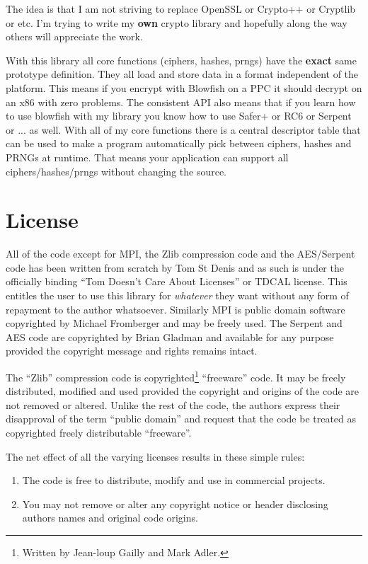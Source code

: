 \documentclass{book}
\begin{document}
The idea is that I am not striving to replace OpenSSL or Crypto++ or Cryptlib or etc.  I'm trying to write my 
{\bf own} crypto library and hopefully along the way others will appreciate the work.

With this library all core functions (ciphers, hashes, prngs) have the {\bf exact} same prototype definition.  They all load
and store data in a format independent of the platform.  This means if you encrypt with Blowfish on a PPC it should decrypt
on an x86 with zero problems.  The consistent API also means that if you learn how to use blowfish with my library you 
know how to use Safer+ or RC6 or Serpent or ... as well.  With all of my core functions there is a central descriptor table 
that can be used to make a program automatically pick between ciphers, hashes and PRNGs at runtime.  That means your 
application can support all ciphers/hashes/prngs without changing the source.

\section{License}

All of the code except for MPI, the Zlib compression code and the AES/Serpent code has been written from scratch by 
Tom St Denis and as such is under the officially binding ``Tom Doesn't Care About Licenses'' or TDCAL license.  This entitles the 
user to use this library for {\em whatever} they want without any form of repayment to the author whatsoever.  Similarly
MPI is public domain software copyrighted by Michael Fromberger and may be freely used.  The Serpent and AES code are 
copyrighted by Brian Gladman and available for any purpose provided the copyright message and rights remains intact.

The ``Zlib'' compression code is copyrighted\footnote{Written by Jean-loup Gailly and Mark Adler.} ``freeware'' code.  It
may be freely distributed, modified and used provided the copyright and origins of the code are not removed or altered.
Unlike the rest of the code, the authors express their disapproval of the term ``public domain'' and request that the
code be treated as copyrighted freely distributable ``freeware''.

The net effect of all the varying licenses results in these simple rules:
\begin{enumerate}
     \item The code is free to distribute, modify and use in commercial projects.
     \item You may not remove or alter any copyright notice or header disclosing authors names and original code origins.
\end{enumerate}
\end{document}
